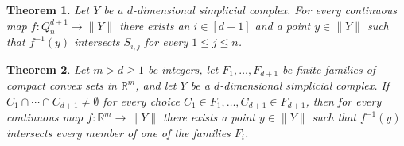 \documentclass[10pt,a4paper]{amsart}
\newtheorem{theorem}{Theorem}
\newcommand{\cubical}[2]{Q_{#1}^{#2}}
\newcommand{\slice}[2]{S_{#1,#2} }
\begin{document}
\begin{theorem}\label{t:top col helly}
Let $Y$ be a $d$-dimensional simplicial complex. For every continuous map  $f \colon \cubical{n}{d+1} \to \|Y\|$ there exists an $i \in [d+1]$ and a point $y\in \|Y\|$ such that $f^{-1}(y)$ intersects $\slice{i}{j}$ for every $1\leq j\leq n$.
\end{theorem}

\begin{theorem}\label{thm:convex version}
Let $m >  d\geq 1$ be integers, let $F_1, \dots, F_{d+1}$ be finite families of compact convex sets in $\mathbb{R}^m$, and let $Y$ be a $d$-dimensional simplicial complex. If $C_1\cap \cdots \cap C_{d+1}\neq\emptyset$ for every choice $C_1\in F_1, \dots, C_{d+1}\in F_{d+1}$, then for every continuous map $f \colon \mathbb{R}^m \to \|Y\|$ there exists a point $y\in \|Y\|$ such that $f^{-1}(y)$ intersects every member of one of the families $F_i$.
\end{theorem}
\end{document}
